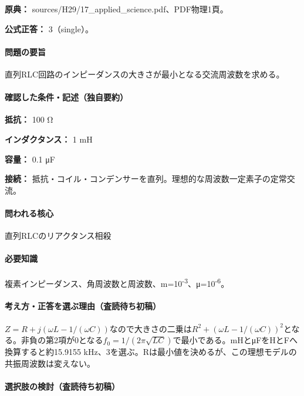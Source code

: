 \noindent\textbf{原典：} sources/H29/17\_applied\_science.pdf、PDF物理1頁。

\textbf{公式正答：} 3（single）。

\paragraph{問題の要旨} 直列RLC回路のインピーダンスの大きさが最小となる交流周波数を求める。

\paragraph{確認した条件・記述（独自要約）}\mbox{}\par

\noindent\textbf{抵抗：} 100 Ω\par

\noindent\textbf{インダクタンス：} 1 mH\par

\noindent\textbf{容量：} 0.1 μF\par

\noindent\textbf{接続：} 抵抗・コイル・コンデンサーを直列。理想的な周波数一定素子の定常交流。\par

\paragraph{問われる核心} 直列RLCのリアクタンス相殺

\paragraph{必要知識} 複素インピーダンス、角周波数と周波数、m=\allowbreak{}10\textsuperscript{-3}、μ=10\textsuperscript{-6}。

\paragraph{考え方・正答を選ぶ理由（査読待ち初稿）} \(Z=R+j(\omega L-1/(\omega C))\)なので大きさの二乗は\(R^2+(\omega L-1/(\omega C))^2\)となる。非負の第2項が0となる\(f_0=1/(2\pi\sqrt{LC})\)で最小である。mHとμFをHとFへ換算すると約15.9155 kHz、3を選ぶ。Rは最小値を決めるが、この理想モデルの共振周波数は変えない。

\paragraph{選択肢の検討（査読待ち初稿）}\mbox{}\par

